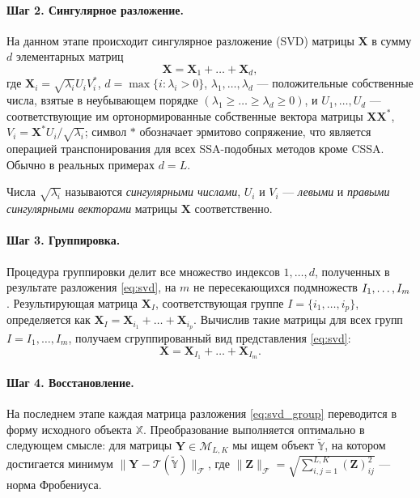 \documentclass[specialist,
               substylefile = spbu.rtx,
               subf,href,colorlinks=true, 12pt]{disser}
\begin{document}
\paragraph{Шаг 2. Сингулярное разложение.}
На данном этапе происходит сингулярное разложение (SVD) матрицы $\mathbf{X}$ в сумму $d$ элементарных матриц
\begin{equation} \label{eq:svd}
    \mathbf{X}=\mathbf{X}_1+\ldots+\mathbf{X}_d,
\end{equation}
где
$\mathbf{X}_i=\sqrt{\lambda_i}U_i V_i^\mathrm{*}$, $d=\max\{i : \lambda_i > 0\}$,
$\lambda_1,\ldots,\lambda_d$ --- положительные собственные числа, взятые в неубывающем порядке $(\lambda_1\geqslant\ldots\geqslant\lambda_d\geqslant 0)$, и $U_1,\ldots,U_d$ --- соответствующие им ортонормированные собственные вектора матрицы  $\mathbf{X}\mathbf{X}^\mathrm{*}$, $V_i=\mathbf{X}^\mathrm{*} U_i/\sqrt{\lambda_i}$; символ $\mathrm{*}$ обозначает эрмитово сопряжение, что является операцией транспонирования для всех SSA-подобных методов кроме CSSA. 
Обычно в реальных примерах $d=L$.

Числа $\sqrt{\lambda_i}$ называются \emph{сингулярными числами}, $U_i$  и $V_i$ --- \emph{левыми} и \emph{правыми сингулярными векторами} матрицы  $\mathbf{X}$ соответственно.

\paragraph{Шаг 3. Группировка.}  Процедура группировки делит все множество индексов ${1,\ldots,d}$, полученных в результате разложения \eqref{eq:svd}, на $m$ не пересекающихся подмножеств $I_1,\ldots,\\ I_m$.
Результирующая матрица $\mathbf{X}_I$, соответствующая группе $I=\{i_1,\ldots,i_p\}$, определяется как $\mathbf{X}_I=\mathbf{X}_{i_1}+\ldots+\mathbf{X}_{i_p}$.
Вычислив такие матрицы для всех групп $I=I_1,\ldots,I_m$, получаем сгруппированный вид представления \eqref{eq:svd}:
\begin{equation}\label{eq:svd_group}
    \mathbf{X}=\mathbf{X}_{I_1}+\ldots+\mathbf{X}_{I_m}.
\end{equation}

\paragraph{Шаг 4. Восстановление.}
На последнем этапе каждая матрица разложения \eqref{eq:svd_group} переводится в форму исходного объекта $\mathbb{X}$. Преобразование выполняется оптимально в следующем смысле: для матрицы $\mathbf{Y} \in \mathcal{M}_{L,K}$ мы ищем объект $\widetilde{\mathbb{Y}}$, на котором достигается минимум $\|\mathbf{Y} -  \mathcal{T}(\widetilde{\mathbb{Y}})\|_{\mathcal{F}}$, где $\|\mathbf{Z}\|_{\mathcal{F}} = \sqrt{\sum_{i,j=1}^{L,K}(\mathbf{Z})_{ij}^2}$ --- норма Фробениуса.
\end{document}
